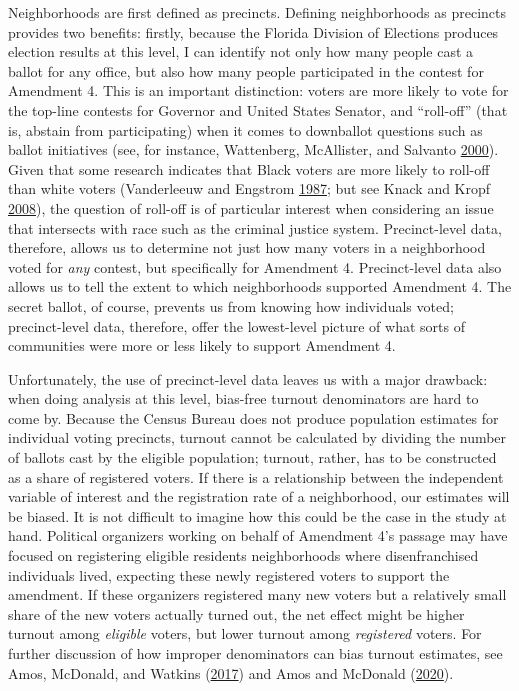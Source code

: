 \documentclass[
  12pt,
]{article}
\begin{document}
Neighborhoods are first defined as precincts. Defining neighborhoods as precincts provides two benefits: firstly, because the Florida Division of Elections produces election results at this level, I can identify not only how many people cast a ballot for any office, but also how many people participated in the contest for Amendment 4. This is an important distinction: voters are more likely to vote for the top-line contests for Governor and United States Senator, and ``roll-off'' (that is, abstain from participating) when it comes to downballot questions such as ballot initiatives (see, for instance, Wattenberg, McAllister, and Salvanto \protect\hyperlink{ref-Wattenberg2000}{2000}). Given that some research indicates that Black voters are more likely to roll-off than white voters (Vanderleeuw and Engstrom \protect\hyperlink{ref-Vanderleeuw1987}{1987}; but see Knack and Kropf \protect\hyperlink{ref-Knack2008}{2008}), the question of roll-off is of particular interest when considering an issue that intersects with race such as the criminal justice system. Precinct-level data, therefore, allows us to determine not just how many voters in a neighborhood voted for \emph{any} contest, but specifically for Amendment 4. Precinct-level data also allows us to tell the extent to which neighborhoods supported Amendment 4. The secret ballot, of course, prevents us from knowing how individuals voted; precinct-level data, therefore, offer the lowest-level picture of what sorts of communities were more or less likely to support Amendment 4.

Unfortunately, the use of precinct-level data leaves us with a major drawback: when doing analysis at this level, bias-free turnout denominators are hard to come by. Because the Census Bureau does not produce population estimates for individual voting precincts, turnout cannot be calculated by dividing the number of ballots cast by the eligible population; turnout, rather, has to be constructed as a share of registered voters. If there is a relationship between the independent variable of interest and the registration rate of a neighborhood, our estimates will be biased. It is not difficult to imagine how this could be the case in the study at hand. Political organizers working on behalf of Amendment 4's passage may have focused on registering eligible residents neighborhoods where disenfranchised individuals lived, expecting these newly registered voters to support the amendment. If these organizers registered many new voters but a relatively small share of the new voters actually turned out, the net effect might be higher turnout among \emph{eligible} voters, but lower turnout among \emph{registered} voters. For further discussion of how improper denominators can bias turnout estimates, see Amos, McDonald, and Watkins (\protect\hyperlink{ref-Amos2017}{2017}) and Amos and McDonald (\protect\hyperlink{ref-Amos2020}{2020}).
\end{document}
